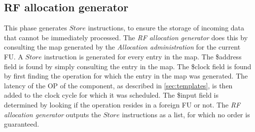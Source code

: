 
\subsection*{RF allocation generator}
This phase generates $Store$ instructions, to ensure the storage of incoming data that cannot be immediately processed. The \textit{RF allocation generator} does this by consulting the map generated by the \textit{Allocation administration} for the current FU. A $Store$ instruction is generated for every entry in the map. The \$address field is found by simply consulting the entry in the map. The \$clock field is found by first finding the operation for which the entry in the map was generated. The latency of the OP of the component, as described in \ref{sec:templates}, is then added to the clock cycle for which it was scheduled. The \$input field is determined by looking if the operation resides in a foreign FU or not. The \textit{RF allocation generator} outputs the $Store$ instructions as a list, for which no order is guaranteed.




